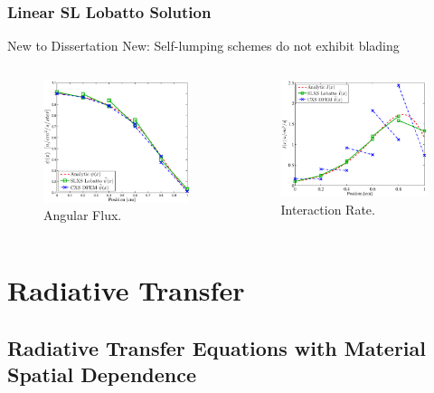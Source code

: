 \documentclass{beamer}
\begin{document}
\begin{frame}
\frametitle{Linear SL Lobatto Solution}
\begin{block}{New to Dissertation}
New: Self-lumping schemes do not exhibit blading
\end{block}
\begin{columns}[c]
\begin{figure}
\includegraphics[width=5cm]{SLXS_Psi_Profile.eps}
\caption{Angular Flux.}
\end{figure}
\begin{figure}
\includegraphics[width=5cm]{SLXS_I_Profile.eps}
\caption{Interaction Rate.}
\end{figure}
\end{columns}

\end{frame}

\section{Radiative Transfer }

\subsection{Radiative Transfer Equations with Material Spatial Dependence}
\end{document}
